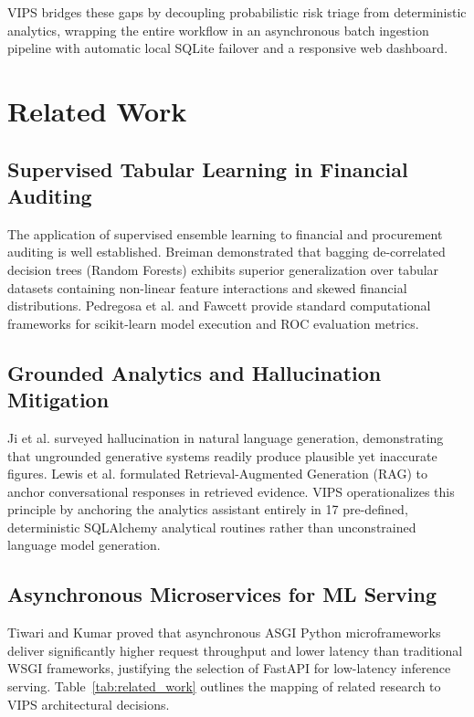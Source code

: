 \documentclass[conference]{IEEEtran}
\begin{document}
VIPS bridges these gaps by decoupling probabilistic risk triage from deterministic analytics, wrapping the entire workflow in an asynchronous batch ingestion pipeline with automatic local SQLite failover and a responsive web dashboard.

\section{Related Work}

\subsection{Supervised Tabular Learning in Financial Auditing}

The application of supervised ensemble learning to financial and procurement auditing is well established. Breiman \cite{breiman} demonstrated that bagging de-correlated decision trees (Random Forests) exhibits superior generalization over tabular datasets containing non-linear feature interactions and skewed financial distributions. Pedregosa et al. \cite{pedregosa} and Fawcett \cite{fawcett} provide standard computational frameworks for scikit-learn model execution and ROC evaluation metrics.

\subsection{Grounded Analytics and Hallucination Mitigation}

Ji et al. \cite{ji_hallucination} surveyed hallucination in natural language generation, demonstrating that ungrounded generative systems readily produce plausible yet inaccurate figures. Lewis et al. \cite{lewis_rag} formulated Retrieval-Augmented Generation (RAG) to anchor conversational responses in retrieved evidence. VIPS operationalizes this principle by anchoring the analytics assistant entirely in 17 pre-defined, deterministic SQLAlchemy analytical routines rather than unconstrained language model generation.

\subsection{Asynchronous Microservices for ML Serving}

Tiwari and Kumar \cite{tiwari} proved that asynchronous ASGI Python microframeworks deliver significantly higher request throughput and lower latency than traditional WSGI frameworks, justifying the selection of FastAPI for low-latency inference serving. Table~\ref{tab:related_work} outlines the mapping of related research to VIPS architectural decisions.
\end{document}

